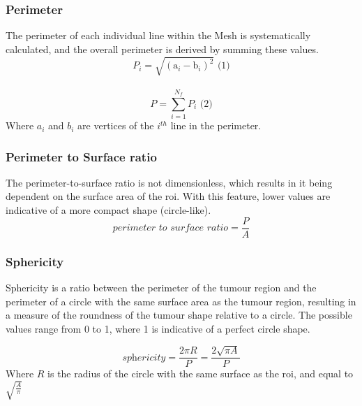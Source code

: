\subsubsection*{Perimeter}
The perimeter of each individual line within the Mesh is systematically calculated, and the overall perimeter is derived by summing these values.
\begin{equation}
    P_i = \sqrt{(\text{a}_i-\text{b}_i)^2} \text{ (1)}
\end{equation}\\
\begin{equation}
    P = \displaystyle\sum^{N_f}_{i=1}{P_i} \text{ (2)}
\end{equation}
Where $a_i$ and $b_i$ are vertices of the $i^{th}$ line in the perimeter.
\subsubsection*{Perimeter to Surface ratio}
The perimeter-to-surface ratio is not dimensionless, which results in it being dependent on the surface area of the \ac{roi}. With this feature, lower values are indicative of a more compact shape (circle-like).
\begin{equation}
    \textit{perimeter to surface ratio} = \frac{P}{A}
\end{equation}

\subsubsection*{Sphericity}
Sphericity is a ratio between the perimeter of the tumour region and the perimeter of a circle with the same surface area as the tumour region, resulting in a measure of the roundness of the tumour shape relative to a circle.
The possible values range from 0 to 1, where 1 is indicative of a perfect circle shape.

\begin{equation}
    \textit{sphericity} = \frac{2\pi R}{P} = \frac{2\sqrt{\pi A}}{P}
\end{equation}
Where $R$ is the radius of the circle with the same surface as the \ac{roi}, and equal to $\sqrt{\frac{A}{\pi}}$


